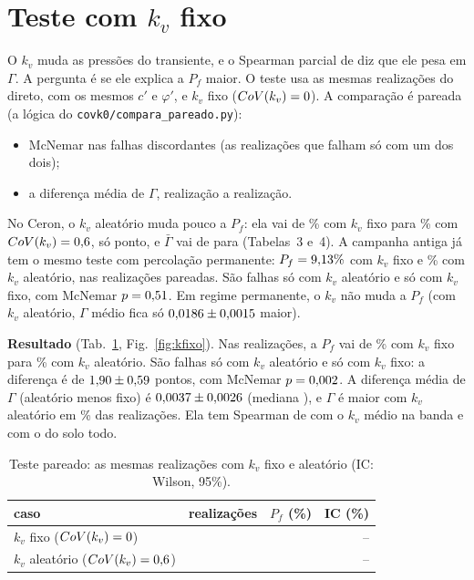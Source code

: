 \documentclass[11pt,a4paper]{article}
\newcommand{\linhaKfixoPronta}{$k_v$ fixo ($CoV(k_v) = \CovKfixo$) & \KNPar & \KPfFixo & \KPfFixoLo--\KPfFixoHi \\
$k_v$ aleatório ($CoV(k_v) = \CovK$) & \KNPar & \KPfAleat & \KPfAleatLo--\KPfAleatHi \\}
\begin{document}
\section{Teste com \texorpdfstring{$k_v$}{kv} fixo}\label{sec:kfixo}
O $k_v$ muda as pressões do transiente, e o Spearman parcial de \ParcK{} diz que ele pesa em $\Gamma$. A pergunta é
se ele explica a $P_f$ maior. O teste usa as mesmas \NAlvoKfixo{} realizações do direto, com os mesmos $c'$ e
$\varphi'$, e $k_v$ fixo ($CoV(k_v) = 0$). A comparação é pareada (a lógica do
\texttt{covk0/compara\_pareado.py}):
\begin{itemize}
\item McNemar nas falhas discordantes (as realizações que falham só com um dos dois);
\item a diferença média de $\Gamma$, realização a realização.
\end{itemize}
No Ceron, o $k_v$ aleatório muda pouco a $P_f$: ela vai de \PfCeronKfixo\% com $k_v$ fixo para \PfCeron\% com
$CoV(k_v) = 0{,}6$, só \CeronDifK{} ponto, e $\bar\Gamma$ vai de \GammaMediaCeronKfixo{} para \GammaMediaCeron{}
(Tabelas~3 e~4). A campanha antiga já tem o mesmo teste com percolação permanente: $P_f = 9{,}13\%$ com $k_v$ fixo e \AntPfAleat\%
com $k_v$ aleatório, nas \AntNPar{} realizações pareadas. São \AntNzu{} falhas só com $k_v$ aleatório e \AntNuz{} só
com $k_v$ fixo, com McNemar $p = 0{,}51$. Em regime permanente, o $k_v$ não muda a $P_f$ (com $k_v$ aleatório,
$\Gamma$ médio fica só $0{,}0186 \pm 0{,}0015$ maior).

\ifkfixopronto
\textbf{Resultado} (Tab.~\ref{tab:kfixo}, Fig.~\ref{fig:kfixo}). Nas \KNPar{} realizações, a $P_f$ vai de
\KPfFixo\% com $k_v$ fixo para \KPfAleat\% com $k_v$ aleatório. São \KNzu{} falhas só com $k_v$ aleatório e \KNuz{}
só com $k_v$ fixo: a diferença é de $1{,}90 \pm 0{,}59$ pontos, com McNemar $p = 0{,}002$. A diferença média de
$\Gamma$ (aleatório menos fixo) é $0{,}0037 \pm 0{,}0026$ (mediana \KDifGammaMediana), e $\Gamma$ é maior com
$k_v$ aleatório em \KMaisAleat\% das realizações. Ela tem Spearman de \KRhoBanda{} com o $k_v$ médio na banda e
\KRhoSolo{} com o do solo todo. \KConclusao

\begin{table}[htbp]\centering\footnotesize
\caption{Teste pareado: as mesmas realizações com $k_v$ fixo e aleatório (IC: Wilson, 95\%).}\label{tab:kfixo}
\begin{tabular}{lrrr}\toprule
caso & realizações & $P_f$ (\%) & IC (\%) \\\midrule
\linhaKfixoPronta
\bottomrule\end{tabular}\end{table}
\end{document}

